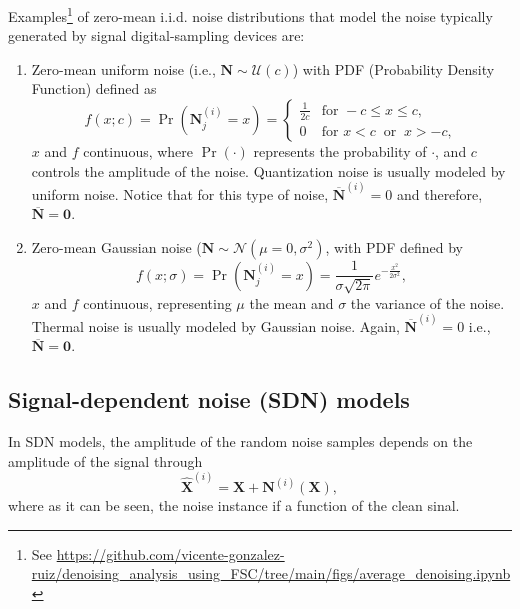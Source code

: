 \documentclass{article}
\begin{document}
Examples\footnote{See
  \url{https://github.com/vicente-gonzalez-ruiz/denoising_analysis_using_FSC/tree/main/figs/average_denoising.ipynb}}
of zero-mean i.i.d. noise distributions that model the noise typically
generated by signal digital-sampling devices are:
\begin{enumerate}
\item Zero-mean uniform noise (i.e., ${\mathbf N}\sim{\mathcal U}(c)$) with
  PDF (Probability Density Function) defined as
  \begin{equation}
    f(x; c) = \Pr({\mathbf N}^{(i)}_j{=}x) = \begin{cases}
      \frac{1}{2c} & \text{for } -c \le x \le c, \\[8pt]
      0 & \text{for } x < c \ \text{ or } \ x > -c,
    \end{cases}
  \end{equation}
  $x$ and $f$ continuous, where $\Pr(\cdot)$ represents the
  probability of $\cdot$, and $c$ controls the amplitude of the
  noise. Quantization noise is usually modeled by uniform
  noise. Notice that for this type of noise,
  $\overline{\mathbf{N}}^{(i)}=0$ and therefore,
  $\overline{\mathbf N}={\mathbf 0}$.
\item Zero-mean Gaussian noise
  (${\mathbf N}\sim{\mathcal N}(\mu=0,\sigma^2)$,  with PDF defined by
  \begin{equation}
    f(x; \sigma) = \Pr({\mathbf N}^{(i)}_j{=}x) = \frac 1 {\sigma\sqrt{2\pi}} e^{-\frac{x^2}{2\sigma^2} },
  \end{equation}
  $x$ and $f$ continuous, representing $\mu$ the mean and $\sigma$ the
  variance of the noise. Thermal noise is usually modeled by Gaussian
  noise. Again, $\overline{\mathbf{N}}^{(i)}=0$ i.e.,
  $\overline{\mathbf N}={\mathbf 0}$.
\end{enumerate}

\subsection{Signal-dependent noise (SDN) models}
In SDN models, the amplitude of the random noise samples depends on the amplitude of the signal through
\begin{equation}
  \hat{\mathbf X}^{(i)} = \mathbf{X} + {\mathbf N}^{(i)}(\mathbf{X}),
  \label{eq:SDN_model}
\end{equation}
where as it can be seen, the noise instance if a function of the clean
sinal.
\end{document}
